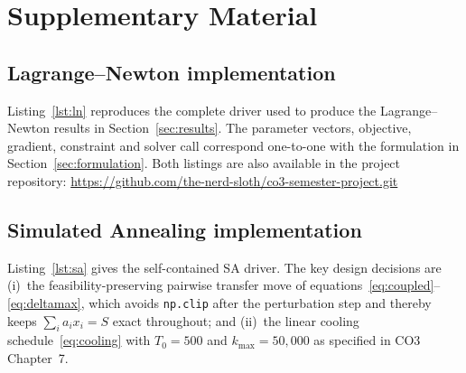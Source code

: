 \chapter{Supplementary Material}
\label{app:supp}

\section{Lagrange--Newton implementation}
\label{app:code}

Listing~\ref{lst:ln} reproduces the complete driver used to
produce the Lagrange--Newton results in
Section~\ref{sec:results}. The parameter vectors, objective,
gradient, constraint and solver call correspond one-to-one with
the formulation in Section~\ref{sec:formulation}. Both listings
are also available in the project repository:
\url{https://github.com/the-nerd-sloth/co3-semester-project.git}

\vspace{0.5cm}
{\captionsetup{justification=raggedright,singlelinecheck=false}
}

\section{Simulated Annealing implementation}
\label{app:sa}

Listing~\ref{lst:sa} gives the self-contained SA driver.
The key design decisions are (i)~the feasibility-preserving
pairwise transfer move of equations~\eqref{eq:coupled}--\eqref{eq:deltamax},
which avoids \texttt{np.clip} after the perturbation step and
thereby keeps $\sum_i a_i x_i = S$ exact throughout; and
(ii)~the linear cooling schedule~\eqref{eq:cooling} with
$T_0 = 500$ and $k_{\max}=50{,}000$ as specified in CO3 Chapter~7.


